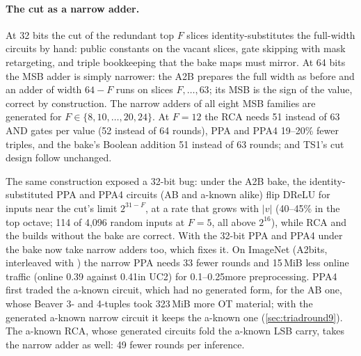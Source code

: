 \paragraph{The cut as a narrow adder.} At 32 bits the cut of the redundant top $F$ slices identity-substitutes the
full-width circuits by hand: public constants on the vacant slices, gate skipping with mask retargeting, and triple
bookkeeping that the bake maps must mirror. At 64 bits the MSB adder is simply narrower: the A2B prepares the full width
as before and an adder of width $64 - F$ runs on slices $F, \dots, 63$; its MSB is the sign of the value, correct by
construction. The narrow adders of all eight MSB families are generated for $F \in \{8, 10, \dots, 20, 24\}$. At
$F = 12$ the RCA needs 51 instead of 63 AND gates per value (52 instead of 64 rounds), PPA and PPA4 19--20\% fewer
triples, and the bake's Boolean addition 51 instead of 63 rounds;  and TS1's cut design follow unchanged.

The same construction exposed a 32-bit bug: under the A2B bake, the identity-substituted PPA and PPA4 circuits (AB
and a-known alike) flip DReLU for inputs near the cut's limit $2^{31-F}$, at a rate that grows with $|v|$ (40--45\% in
the top octave; 114 of 4,096 random inputs at $F = 5$, all above $2^{16}$), while RCA and the builds without the bake
are correct. With  the 32-bit PPA and PPA4 under the bake now take narrow adders too, which fixes it.
On ImageNet (A2bits, interleaved with ) the narrow PPA needs 33 fewer rounds and 15\,MiB less
online traffic (online 0.39 against 0.41\s in UC2) for 0.1--0.25\s more preprocessing. PPA4 first traded the a-known
circuit, which had no generated form, for the AB one, whose Beaver 3- and 4-tuples took 323\,MiB more OT material;
with the generated a-known narrow circuit it keeps the a-known one (\cref{sec:triadround9}). The a-known RCA, whose
generated circuits fold the a-known LSB carry, takes the narrow adder as well: 49 fewer rounds per inference.

